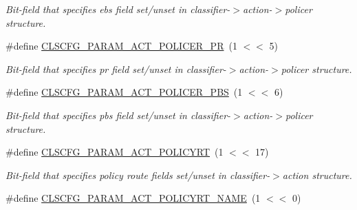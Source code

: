 \begin{DoxyCompactItemize}
\begin{DoxyCompactList}\small\item\em Bit-\/field that specifies ebs field set/unset in classifier-\/$>$action-\/$>$policer structure. \end{DoxyCompactList}\item 
\hypertarget{group__FAPI__QOS__CLASS_gaa4256bde3605ed2ac5cc85280638a25f}{\#define \hyperlink{group__FAPI__QOS__CLASS_gaa4256bde3605ed2ac5cc85280638a25f}{C\-L\-S\-C\-F\-G\-\_\-\-P\-A\-R\-A\-M\-\_\-\-A\-C\-T\-\_\-\-P\-O\-L\-I\-C\-E\-R\-\_\-\-P\-R}~(1 $<$$<$ 5)}\label{group__FAPI__QOS__CLASS_gaa4256bde3605ed2ac5cc85280638a25f}

\begin{DoxyCompactList}\small\item\em Bit-\/field that specifies pr field set/unset in classifier-\/$>$action-\/$>$policer structure. \end{DoxyCompactList}\item 
\hypertarget{group__FAPI__QOS__CLASS_gaf204365272441bc75697ef596cfc0d94}{\#define \hyperlink{group__FAPI__QOS__CLASS_gaf204365272441bc75697ef596cfc0d94}{C\-L\-S\-C\-F\-G\-\_\-\-P\-A\-R\-A\-M\-\_\-\-A\-C\-T\-\_\-\-P\-O\-L\-I\-C\-E\-R\-\_\-\-P\-B\-S}~(1 $<$$<$ 6)}\label{group__FAPI__QOS__CLASS_gaf204365272441bc75697ef596cfc0d94}

\begin{DoxyCompactList}\small\item\em Bit-\/field that specifies pbs field set/unset in classifier-\/$>$action-\/$>$policer structure. \end{DoxyCompactList}\item 
\hypertarget{group__FAPI__QOS__CLASS_ga94b4e8ac023086bd663c21021b03f5f0}{\#define \hyperlink{group__FAPI__QOS__CLASS_ga94b4e8ac023086bd663c21021b03f5f0}{C\-L\-S\-C\-F\-G\-\_\-\-P\-A\-R\-A\-M\-\_\-\-A\-C\-T\-\_\-\-P\-O\-L\-I\-C\-Y\-R\-T}~(1 $<$$<$ 17)}\label{group__FAPI__QOS__CLASS_ga94b4e8ac023086bd663c21021b03f5f0}

\begin{DoxyCompactList}\small\item\em Bit-\/field that specifies policy route fields set/unset in classifier-\/$>$action structure. \end{DoxyCompactList}\item 
\hypertarget{group__FAPI__QOS__CLASS_ga923d2b6da24fe5f1e2357d4bdc59e838}{\#define \hyperlink{group__FAPI__QOS__CLASS_ga923d2b6da24fe5f1e2357d4bdc59e838}{C\-L\-S\-C\-F\-G\-\_\-\-P\-A\-R\-A\-M\-\_\-\-A\-C\-T\-\_\-\-P\-O\-L\-I\-C\-Y\-R\-T\-\_\-\-N\-A\-M\-E}~(1 $<$$<$ 0)}\label{group__FAPI__QOS__CLASS_ga923d2b6da24fe5f1e2357d4bdc59e838}


\end{DoxyCompactItemize}
